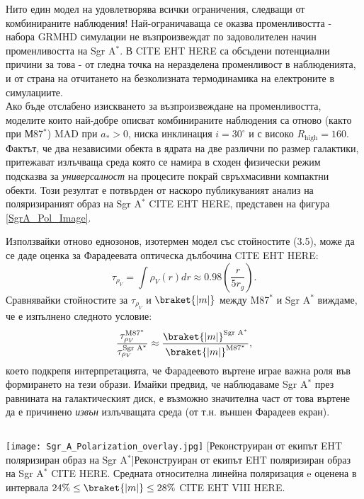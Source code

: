 Нито един модел на удовлетворява всички ограничения, следващи от комбинираните наблюдения! Най-ограничаваща се оказва променливостта - набора GRMHD симулации не възпроизвеждат по задоволителен начин променливостта на Sgr A$^*$. В CITE EHT HERE са обсъдени потенциални причини за това - от гледна точка на неразделена променливост в наблюденията, и от страна на отчитането на безколизната термодинамика на електроните в симулациите.\\\newline
Ако бъде отслабено изискването за възпроизвеждане на променливостта, моделите които най-добре описват комбинираните наблюдения са отново (както при М87$^*$) MAD при $a_*>0$, ниска инклинация $i = 30^\circ$ и с високо $R_\text{high} = 160$. Фактът, че два независими обекта в ядрата на две различни по размер галактики, притежават излъчваща среда която се намира в сходен физически режим подсказва за \emph{универсалност} на процесите покрай свръхмасивни компактни обекти. Този резултат е потвърден от наскоро публикуваният анализ на поляризираният образ на Sgr A$^*$ CITE EHT HERE, представен на фигура \ref{SgrA_Pol_Image}.\\

\begin{minipage}{18em}
	Използвайки отново еднозонов, изотермен модел със стойностите (3.5), може да се даде оценка за Фарадеевата оптическа дълбочина CITE EHT HERE:
	\begin{equation}
		\tau_{\rho_V} = \int \rho_{V}(r)dr\approx 0.98\left(\frac{r}{5r_g}\right).
	\end{equation}
	Сравнявайки стойностите за $\tau_{\rho_V}$ и $\braket{|m|}$ между M87$^*$ и Sgr A$^*$ виждаме, че е изпълнено следното условие:
	\begin{equation}
		\frac{\tau_{\rho_V}^{\text{M87}^*}}{\tau_{\rho_V}^{\text{Sgr A}^*}}\approx\frac{\braket{|m|}^{\text{Sgr A}^*}}{\braket{|m|}^{\text{M87}^*}},
	\end{equation}
	което подкрепя интерпретацията, че Фарадеевото въртене играе важна роля във формирането на тези образи. Имайки предвид, че наблюдаваме Sgr A$^*$ през равнината на галактическият диск, е възможно значителна част от това въртене да е причинено \emph{извън} излъчващата среда (от т.н. външен Фарадеев екран).
\end{minipage}$\,\,\,$
\begin{minipage}{15em}
	\centering
	\texttt{[image: Sgr\_A\_Polarization\_overlay.jpg]}
	[Реконструиран от екипът EHT поляризиран образ на Sgr A$^*$]{Реконструиран от екипът EHT поляризиран образ на Sgr A$^*$ CITE HERE. Средната относителна линейна поляризация e оценена в интервала $24\% \le \braket{|m|} \le 28\%$ CITE EHT VIII HERE.}
	\label{SgrA_Pol_Image}
\end{minipage}\\

